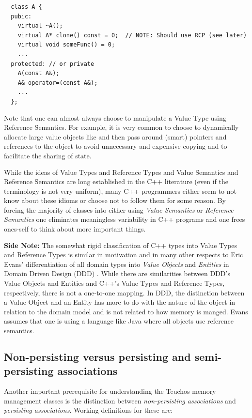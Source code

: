 \documentclass[pdf,ps2pdf,11pt]{SANDreport}
\begin{document}
{\small\begin{verbatim}
  class A {
  pubic:
    virtual ~A();
    virtual A* clone() const = 0;  // NOTE: Should use RCP (see later)
    virtual void someFunc() = 0;
    ...
  protected: // or private
    A(const A&);
    A& operator=(const A&);
    ...
  };
\end{verbatim}}

Note that one can almost always choose to manipulate a Value Type
using Reference Semantics.  For example, it is very common to choose
to dynamically allocate large value objects like {}
and then pass around (smart) pointers and references to the object to
avoid unnecessary and expensive copying and to facilitate the sharing
of state.

While the ideas of Value Types and Reference Types and Value Semantics
and Reference Semantics are long established in the C++ literature
(even if the terminology is not very uniform), many C++ programmers
either seem to not know about these idioms or choose not to follow
them for some reason.  By forcing the majority of classes into either
using {}\textit{Value Semantics} or {}\textit{Reference Semantics} one
eliminates meaningless variability in C++ programs and one frees
ones-self to think about more important things.

{}\textbf{Side Note:} The somewhat rigid classification of C++ types
into Value Types and Reference Types is similar in motivation and in
many other respects to Eric Evans' differentiation of all domain types
into {}\textit{Value Objects} and {}\textit{Entities} in Domain Driven
Design (DDD) {}\cite{DomainDrivenDesign}.  While there are
similarities between DDD's Value Objects and Entities and C++'s Value
Types and Reference Types, respectively, there is not a one-to-one
mapping.  In DDD, the distinction between a Value Object and an Entity
has more to do with the nature of the object in relation to the domain
model and is not related to how memory is manged.  Evans assumes that
one is using a language like Java where all objects use reference
semantics.


%
{}\subsection{Non-persisting versus persisting and semi-persisting
associations}
\label{sec:nonpersisting-persisting-associations}
%

Another important prerequisite for understanding the Teuchos memory
management classes is the distinction between {}\textit{non-persisting
associations} and {}\textit{persisting associations}.  Working
definitions for these are:
\end{document}
